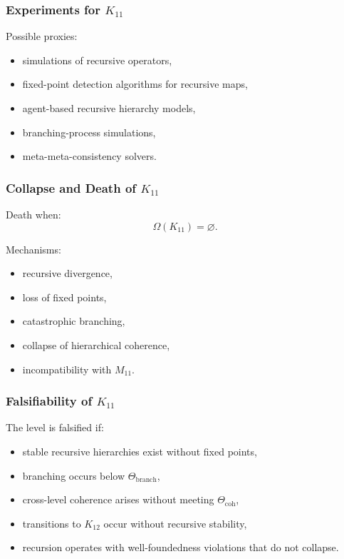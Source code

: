\subsubsection{Experiments for $K_{11}$}

Possible proxies:
\begin{itemize}
    \item simulations of recursive operators,
    \item fixed-point detection algorithms for recursive maps,
    \item agent-based recursive hierarchy models,
    \item branching-process simulations,
    \item meta-meta-consistency solvers.
\end{itemize}

\subsubsection{Collapse and Death of $K_{11}$}

Death when:
\[
\Omega(K_{11})=\varnothing.
\]

Mechanisms:
\begin{itemize}
    \item recursive divergence,
    \item loss of fixed points,
    \item catastrophic branching,
    \item collapse of hierarchical coherence,
    \item incompatibility with $M_{11}$.
\end{itemize}

\subsubsection{Falsifiability of $K_{11}$}

The level is falsified if:
\begin{itemize}
    \item stable recursive hierarchies exist without fixed points,
    \item branching occurs below $\Theta_{\mathrm{branch}}$,
    \item cross-level coherence arises without meeting $\Theta_{\mathrm{coh}}$,
    \item transitions to $K_{12}$ occur without recursive stability,
    \item recursion operates with well-foundedness violations that do not collapse.
\end{itemize}

